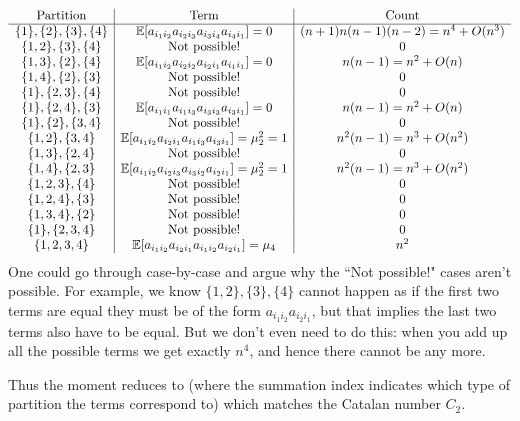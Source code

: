 \[
\begin{array}{c | c | c}
\hbox{Partition} & \hbox{Term} & \hbox{Count} \\
\hline
\{1\}, \{2\}, \{3\}, \{4\} & {\mathbb E}[a_{i_1i_2} a_{i_2i_3} a_{i_3i_4} a_{i_4i_1}] = 0 & (n+1)n(n-1)(n-2)  = n^4 + O(n^3) \\
\{1,2\}, \{3\}, \{4\} & \hbox{Not possible!} & 0 \\
\{1,3\}, \{2\}, \{4\} & {\mathbb E}[a_{i_1i_2} a_{i_2i_2} a_{i_2i_1} a_{i_1i_1}] = 0 & n (n-1) = n^2 + O(n) \\
\{1,4\}, \{2\}, \{3\} & \hbox{Not possible!} & 0 \\
\{1\}, \{2,3\}, \{4\} & \hbox{Not possible!} & 0 \\
\{1\}, \{2,4\}, \{3\} & {\mathbb E}[a_{i_1i_1} a_{i_1i_3} a_{i_3i_3} a_{i_3 i_1}] = 0  & n(n-1) = n^2 + O(n) \\
\{1\}, \{2\}, \{3,4\} & \hbox{Not possible!} & 0 \\
\{1,2\}, \{3,4\} & {\mathbb E}[a_{i_1i_2} a_{i_2i_1} a_{i_1i_3} a_{i_3i_1}] = \mu_2^2 = 1 & n^2 (n-1) = n^3 + O(n^2) \\
\{1,3\}, \{2,4\} & \hbox{Not possible!} & 0 \\
\{1,4\}, \{2,3\} & {\mathbb E}[a_{i_1i_2} a_{i_2i_3} a_{i_3i_2} a_{i_2i_1}] = \mu_2^2 = 1 &  n^2 (n-1) = n^3 + O(n^2) \\
\{1,2,3\}, \{4\} & \hbox{Not possible!} & 0 \\
\{1,2,4\}, \{3\} & \hbox{Not possible!} & 0 \\
\{1,3,4\}, \{2\} & \hbox{Not possible!} & 0 \\
\{1\}, \{2,3,4\} & \hbox{Not possible!} & 0 \\
\{1,2,3,4\} & {\mathbb E}[a_{i_1i_2} a_{i_2i_1} a_{i_1i_2} a_{i_2i_1}] = \mu_4 & n^2
\end{array}
\]
One could go through case-by-case and argue why the ``Not possible!" cases aren't possible. For example, we know $\{1,2\}, \{3\}, \{4\}$ cannot happen as if the first two terms are equal they must be of the form $a_{i_1i_2} a_{i_2 i_1}$, but that implies the last two terms also have to be equal. But we don't even need to do this: when you add up all the possible terms we get exactly $n^4$, and hence there cannot be any more. 

Thus the moment reduces to (where the summation index indicates which type of partition the terms correspond to)
which matches the Catalan number $C_2$. 

